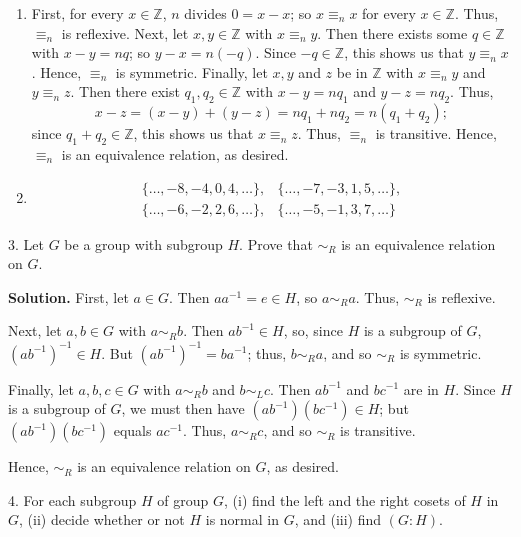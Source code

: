 \documentclass[10pt,]{book}
\theoremstyle{plain}
\theoremstyle{definition}
\theoremstyle{definition}
\theoremstyle{definition}
\theoremstyle{definition}
\numberwithin{equation}{section}
\def\Z{\mathbb{Z}}
\def\siml{\sim_L}
\def\simr{\sim_R}
\newcommand{\amp}{&}
\begin{document}
\begin{exerciselist}
\leavevmode%
\begin{enumerate}[label=(\alph*)]
\item\hypertarget{li-421}{}First, for every \(x \in \Z\), \(n\) divides \(0=x-x\); so \(x\equiv_n x\) for every \(x\in
\Z\).  Thus, \(\equiv_n\) is reflexive. Next, let \(x,y \in \Z\) with \(x\equiv_n y\).  Then there exists some \(q\in \Z\) with \(x-y=nq\); so \(y-x=n(-q)\). Since \(-q\in \Z\), this shows us that \(y\equiv_n x\).  Hence, \(\equiv_n\) is symmetric. Finally, let \(x,y\) and \(z\) be in \(\Z\) with \(x\equiv_n
y\) and \(y\equiv_nz\).  Then there exist \(q_1,q_2 \in \Z\) with \(x-y=nq_1\) and \(y-z=nq_2\).  Thus,%
\begin{equation*}
x-z=(x-y)+(y-z)=nq_1+nq_2=n(q_1+q_2);
\end{equation*}
since \(q_1+q_2 \in \Z\), this shows us that \(x\equiv_n z\).  Thus, \(\equiv_n\) is transitive. Hence, \(\equiv_n\) is an equivalence relation, as desired.%
\item\hypertarget{li-422}{}%
\begin{align*}
\{\ldots,-8,-4,0,4,\ldots\},\amp 
\{\ldots,-7,-3,1,5,\ldots\},\\
\{\ldots,-6,-2,2,6,\ldots\},\amp 
\{\ldots,-5,-1,3,7,\ldots\}
\end{align*}
%
\end{enumerate}
\item[3.]\hypertarget{exercise-52}{}Let \(G\) be a group with subgroup \(H\). Prove that \(\simr\) is an equivalence relation on \(G\).%
\par\smallskip
\par\smallskip
\noindent\textbf{Solution.}\hypertarget{solution-52}{}\quad
First, let \(a\in G\). Then \(aa^{-1}=e\in H\), so \(a\simr a\). Thus, \(\simr\) is reflexive.%
\par
Next, let \(a,b\in G\) with \(a\simr b\). Then \(ab^{-1}\in H\), so, since \(H\) is a subgroup of \(G\), \((ab^{-1})^{-1}\in H\). But \((ab^{-1})^{-1}=ba^{-1}\); thus, \(b\simr a\), and so \(\simr\) is symmetric.%
\par
Finally, let \(a,b,c\in G\) with \(a\simr b\) and \(b\siml c\). Then \(ab^{-1}\) and \(bc^{-1}\) are in \(H\). Since \(H\) is a subgroup of \(G\), we must then have \((ab^{-1})(bc^{-1})\in H\); but \((ab^{-1})(bc^{-1})\) equals \(ac^{-1}\). Thus, \(a\simr c\), and so \(\simr\) is transitive.%
\par
Hence, \(\simr\) is an equivalence relation on \(G\), as desired.%
\item[4.]\hypertarget{exercise-53}{}For each subgroup \(H\) of group \(G\), (i) find the left and the right cosets of \(H\) in \(G\), (ii) decide whether or not \(H\) is normal in \(G\), and (iii) find \((G:H)\).%

\end{exerciselist}
\end{document}
